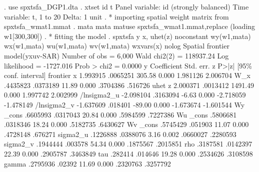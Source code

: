 . use spxtsfa_DGP1.dta
{\smallskip}
. xtset id t 
{\smallskip}
Panel variable: id (strongly balanced)
 Time variable: t, 1 to 20
         Delta: 1 unit
{\smallskip}
. * importing spatial weight matrix from spxtsfa_wmat1.mmat
. mata mata matuse spxtsfa_wmat1.mmat,replace
(loading w1[300,300])
{\smallskip}
. * fitting the model
. spxtsfa y x, uhet(z) noconstant  wy(w1,mata) wx(w1,mata) wu(w1,mata) wv(w1,mata) wxvars(x) nolog
{\smallskip}
Spatial frontier model(yxuv-SAR)                     Number of obs =     6,000
                                                     Wald chi2(2)  = 118937.24
Log likelihood = -1727.016                           Prob > chi2   =    0.0000
{\smallskip}
           y {\VBAR} Coefficient  Std. err.      z    P>|z|     [95\% conf. interval]
frontier     {\VBAR}
           x {\VBAR}   1.993915   .0065251   305.58   0.000     1.981126    2.006704
         W_x {\VBAR}   .4435823   .0373189    11.89   0.000     .3704386     .516726
uhet         {\VBAR}
           z {\VBAR}   2.000371   .0013412  1491.49   0.000     1.997742    2.002999
 /lnsigma2_u {\VBAR}  -2.098104   .3163094    -6.63   0.000    -2.718059   -1.478149
 /lnsigma2_v {\VBAR}  -1.637609    .018401   -89.00   0.000    -1.673674   -1.601544
Wy           {\VBAR}
       _cons {\VBAR}   .6605993   .0317043    20.84   0.000     .5984599    .7227386
Wu           {\VBAR}
       _cons {\VBAR}   .5806681   .0318346    18.24   0.000     .5182735    .6430627
Wv           {\VBAR}
       _cons {\VBAR}   .5745429    .051903    11.07   0.000     .4728148     .676271
    sigma2_u {\VBAR}   .1226888   .0388076     3.16   0.002     .0660027    .2280593
    sigma2_v {\VBAR}   .1944444    .003578    54.34   0.000     .1875567    .2015851
         rho {\VBAR}   .3187581   .0142397    22.39   0.000     .2905787    .3463849
         tau {\VBAR}    .282414    .014646    19.28   0.000     .2534626    .3108598
       gamma {\VBAR}   .2795936     .02392    11.69   0.000     .2320763    .3257792
